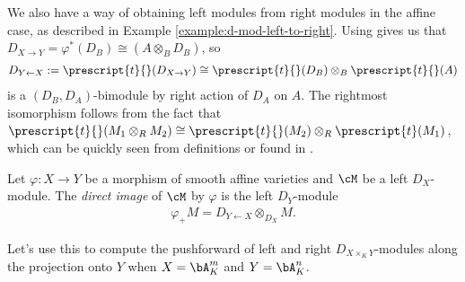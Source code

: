 We also have a way of obtaining left modules from right modules in the affine case, as described in Example \ref{example:d-mod-left-to-right}. Using \cite[Proposition 2.5.2]{hartshorne} gives us that $D_{X\to Y} = \varphi^*(D_{B}) \cong (A\otimes_{B} D_{B})$, so
\begin{align*}
	D_{Y \leftarrow X} := \prescript{t}{}(D_{X\to Y}) \cong \prescript{t}{}(D_{B})\otimes_{B} \prescript{t}{}(A)
\end{align*}
is a $(D_{B},D_{A})$-bimodule by right action of $D_{A}$ on $A$. The rightmost isomorphism follows from the fact that $\prescript{t}{}(M_1\otimes_{R} M_2) \cong \prescript{t}{}(M_2)\otimes_R\prescript{t}(M_1)$, which can be quickly seen from definitions or found in \cite[Chapter 16]{d-mod-primer}.
\begin{defn}\label{defn:direct-image-left-module}
	Let $\varphi:X\to Y$ be a morphism of smooth affine varieties and $\cM$ be a left $D_X$-module. The \emph{direct image} of $\cM$ by $\varphi$ is the left $D_Y$-module
	\begin{align*}
		\varphi_+M = D_{Y\leftarrow X} \otimes_{D_X} M.
	\end{align*}
\end{defn}
\noindent Let's use this to compute the pushforward of left and right $D_{X\times_K Y}$-modules along the projection onto $Y$ when $X = \bA^m_K$ and $Y = \bA^n_K$.
